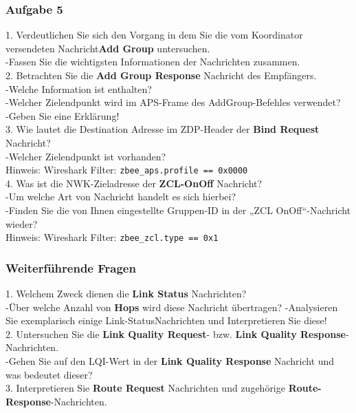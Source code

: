 \subsubsection{Aufgabe 5}
\begin{Fragen}
    1. Verdeutlichen Sie sich den Vorgang in dem Sie die vom Koordinator versendeten Nachricht\textbf{Add Group} untersuchen.\\ 
    -Fassen Sie die wichtigsten Informationen der Nachrichten zusammen. \\
    
    2. Betrachten Sie die \textbf{Add Group Response} Nachricht des Empfängers.\\
    -Welche Information ist enthalten?\\ 
    -Welcher Zielendpunkt wird im APS-Frame des AddGroup-Befehles verwendet?\\ 
    -Geben Sie eine Erklärung! \\
    
    3. Wie lautet die Destination Adresse im ZDP-Header der \textbf{Bind Request} Nachricht?\\
    -Welcher Zielendpunkt ist vorhanden? \\
    Hinweis: Wireshark Filter: \verb|zbee_aps.profile == 0x0000|\\

    4. Was ist die NWK-Zieladresse der \textbf{ZCL-OnOff} Nachricht?\\
    -Um welche Art von Nachricht handelt es sich hierbei?\\
    -Finden Sie die von Ihnen eingestellte Gruppen-ID in der „ZCL OnOff“-Nachricht wieder? \\
    Hinweis: Wireshark Filter: \verb|zbee_zcl.type == 0x1|\\
\end{Fragen}

\subsubsection{Weiterführende Fragen}
\begin{Fragen}
    1. Welchem Zweck dienen die \textbf{Link Status} Nachrichten?\\
    -Über welche Anzahl von \textbf{Hops} wird diese Nachricht übertragen? 
    -Analysieren Sie exemplarisch einige Link-StatusNachrichten und Interpretieren Sie diese! \\

    2. Untersuchen Sie die \textbf{Link Quality Request}- bzw. \textbf{Link Quality Response}-Nachrichten.\\
    -Gehen Sie auf den LQI-Wert in der \textbf{Link Quality Response} Nachricht und was bedeutet dieser? \\

    3. Interpretieren Sie \textbf{Route Request} Nachrichten und zugehörige \textbf{Route-Response}-Nachrichten.\\ 
\end{Fragen}